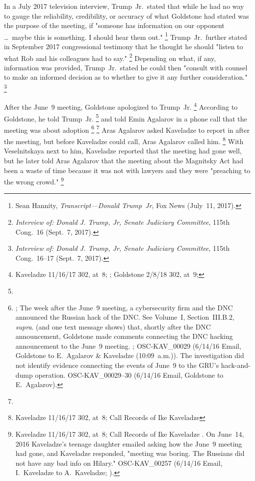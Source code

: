 In a July 2017 television interview, Trump~Jr.\ stated that while he had no way to gauge the reliability, credibility, or accuracy of what Goldstone had stated was the purpose of the meeting, if "someone has information on our opponent \dots\ maybe this is something.
I should hear them out."%
\footnote{Sean Hannity, \textit{Transcript---Donald Trump~Jr}, Fox News (July~11, 2017).}
Trump~Jr.\ further stated in September 2017 congressional testimony that he thought he should "listen to what Rob and his colleagues had to say."%
\footnote{\textit{Interview of: Donald J. Trump, Jr, Senate Judiciary Committee}, 115th Cong.~16 (Sept.~7, 2017).}
Depending on what, if any, information was provided, Trump~Jr.\ stated he could then "consult with counsel to make an informed decision as to whether to give it any further consideration."%
\footnote{\textit{Interview of: Donald J. Trump, Jr, Senate Judiciary Committee}, 115th Cong.~16--17 (Sept.~7, 2017).}

After the June~9 meeting, Goldstone apologized to Trump~Jr.%
\footnote{Kaveladze 11/16/17 302, at~8; ; Goldstone 2/8/18 302, at~9; }
According to Goldstone, he told Trump~Jr.
\footnote{}
and told Emin Agalarov in a phone call that the meeting was about adoption
\footnote{;
The week after the June~9 meeting, a cybersecurity firm and the DNC announced the Russian hack of the DNC\null.
See Volume~I, Section~III.B.2, \textit{supra}.
(and one text message shows) that, shortly after the DNC announcement, Goldstone made comments connecting the DNC hacking announcement to the June~9 meeting.
; OSC-KAV\_00029 (6/14/16 Email, Goldstone to E.~Agalarov \& Kaveladze (10:09~a.m.)).
The investigation did not identify evidence connecting the events of June~9 to the GRU's hack-and-dump operation.
OSC-KAV\_00029--30 (6/14/16 Email, Goldstone to E.~Agalarov).}
\footnote{}
Aras Agalarov asked Kaveladze to report in after the meeting, but before Kaveladze could call, Aras Agalarov called him.%
\footnote{Kaveladze 11/16/17 302, at~8; Call Records of Ike Kaveladze }
With Veselnitskaya next to him, Kaveladze reported that the meeting had gone well, but he later told Aras Agalarov that the meeting about the Magnitsky Act had been a waste of time because it was not with lawyers and they were "preaching to the wrong crowd."%
\footnote{Kaveladze 11/16/17 302, at~8; Call Records of Ike Kaveladze .
On June~14, 2016 Kaveladze's teenage daughter emailed asking how the June~9 meeting had gone, and Kaveladze responded, "meeting was boring.
The Russians did not have any bad info on Hilary."
OSC-KAV\_00257 (6/14/16 Email, I.~Kaveladze to A.~Kaveladze; ).}

